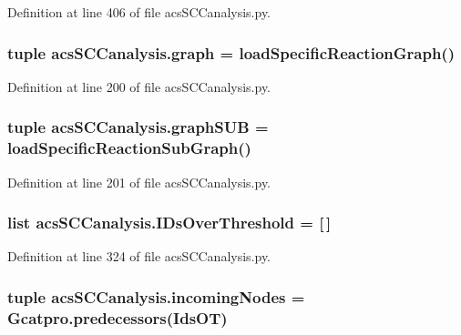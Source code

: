 Definition at line 406 of file acs\+S\+C\+Canalysis.\+py.

\hypertarget{a00130_ab45392da38059bf7557c22cbc73e5580}{
\subsubsection[{graph}]{\setlength{\rightskip}{0pt plus 5cm}tuple acs\+S\+C\+Canalysis.\+graph = {\bf load\+Specific\+Reaction\+Graph}()}}\label{a00130_ab45392da38059bf7557c22cbc73e5580}


Definition at line 200 of file acs\+S\+C\+Canalysis.\+py.

\hypertarget{a00130_ae307841da4a073fad4f6eaa172b0b970}{
\subsubsection[{graph\+S\+U\+B}]{\setlength{\rightskip}{0pt plus 5cm}tuple acs\+S\+C\+Canalysis.\+graph\+S\+U\+B = {\bf load\+Specific\+Reaction\+Sub\+Graph}()}}\label{a00130_ae307841da4a073fad4f6eaa172b0b970}


Definition at line 201 of file acs\+S\+C\+Canalysis.\+py.

\hypertarget{a00130_a578f0f0f1e87579d73b11f8720610b1e}{
\subsubsection[{I\+Ds\+Over\+Threshold}]{\setlength{\rightskip}{0pt plus 5cm}list acs\+S\+C\+Canalysis.\+I\+Ds\+Over\+Threshold = \mbox{[}$\,$\mbox{]}}}\label{a00130_a578f0f0f1e87579d73b11f8720610b1e}


Definition at line 324 of file acs\+S\+C\+Canalysis.\+py.

\hypertarget{a00130_a540ba5319ee67d8a2323099dad73ba36}{
\subsubsection[{incoming\+Nodes}]{\setlength{\rightskip}{0pt plus 5cm}tuple acs\+S\+C\+Canalysis.\+incoming\+Nodes = Gcatpro.\+predecessors(Ids\+O\+T)}}\label{a00130_a540ba5319ee67d8a2323099dad73ba36}


